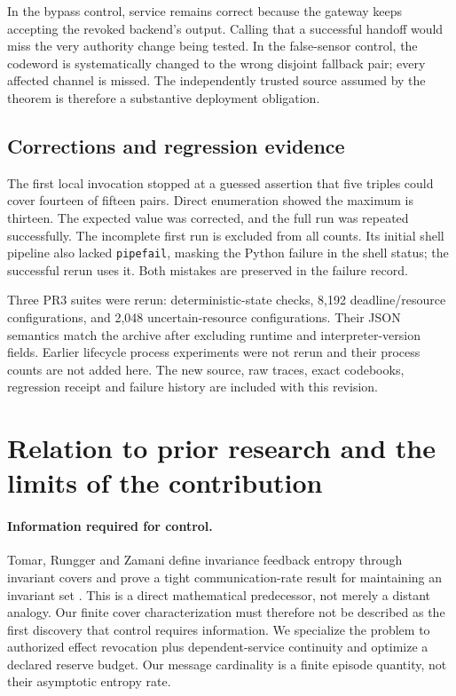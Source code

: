 \documentclass[11pt,a4paper]{article}
\theoremstyle{definition}\newtheorem{definition}{Definition}
\begin{document}
In the bypass control, service remains correct because the gateway keeps accepting the revoked backend's output. Calling that a successful handoff would miss the very authority change being tested. In the false-sensor control, the codeword is systematically changed to the wrong disjoint fallback pair; every affected channel is missed. The independently trusted source assumed by the theorem is therefore a substantive deployment obligation.

\subsection{Corrections and regression evidence}
The first local invocation stopped at a guessed assertion that five triples could cover fourteen of fifteen pairs. Direct enumeration showed the maximum is thirteen. The expected value was corrected, and the full run was repeated successfully. The incomplete first run is excluded from all counts. Its initial shell pipeline also lacked \texttt{pipefail}, masking the Python failure in the shell status; the successful rerun uses it. Both mistakes are preserved in the failure record.

Three PR3 suites were rerun: deterministic-state checks, 8,192 deadline/resource configurations, and 2,048 uncertain-resource configurations. Their JSON semantics match the archive after excluding runtime and interpreter-version fields. Earlier lifecycle process experiments were not rerun and their process counts are not added here. The new source, raw traces, exact codebooks, regression receipt and failure history are included with this revision.

\section{Relation to prior research and the limits of the contribution}
\label{sec:prior}
\paragraph{Information required for control.}
Tomar, Rungger and Zamani define invariance feedback entropy through invariant covers and prove a tight communication-rate result for maintaining an invariant set \cite{tomar}. This is a direct mathematical predecessor, not merely a distant analogy. Our finite cover characterization must therefore not be described as the first discovery that control requires information. We specialize the problem to authorized effect revocation plus dependent-service continuity and optimize a declared reserve budget. Our message cardinality is a finite episode quantity, not their asymptotic entropy rate.
\end{document}
